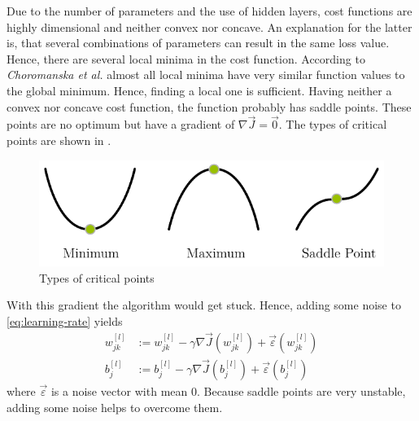 Due to the number of parameters and the use of hidden layers, cost functions are highly dimensional and neither convex nor concave.
An explanation for the latter is, that several combinations of parameters can result in the same loss value.
Hence, there are several local minima in the cost function.
According to \textit{Choromanska et al.} \cite{DBLP:journals/corr/ChoromanskaHMAL14} almost all local minima have very similar function values to the global minimum.
Hence, finding a local one is sufficient.
Having neither a convex nor concave cost function, the function probably has saddle points.
These points are no optimum but have a gradient of $\nabla \vec{J} = \vec{0}$.
The types of critical points are shown in .
\begin{figure}
	\centering
	\includegraphics[]{images/gradient_descent_types.pdf}
	\caption{Types of critical points}
	\label{fig:critical-points}
\end{figure}
With this gradient the algorithm would get stuck.
Hence, adding some noise to \eqref{eq:learning-rate} yields
\begin{subequations}
	\begin{align}
		w^{[l]}_{jk} &:= w^{[l]}_{jk} - \gamma \nabla \vec{J}(w^{[l]}_{jk}) + \vec{\varepsilon}(w^{[l]}_{jk}) \\
		b^{[l]}_j &:= b^{[l]}_j - \gamma \nabla \vec{J}(b^{[l]}_j) + \vec{\varepsilon}(b^{[l]}_j)
	\end{align}
\end{subequations}
where $\vec{\varepsilon}$ is a noise vector with mean 0.
Because saddle points are very unstable, adding some noise helps to overcome them.